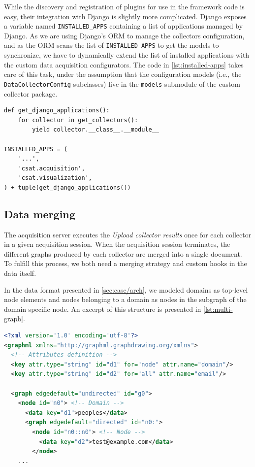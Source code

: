 While the discovery and registration of plugins for use in the framework code is easy, their integration with Django is slightly more complicated. Django exposes a variable named \texttt{INSTALLED\BreakableSlash{}\_APPS} containing a list of applications managed by Django. As we are using Django's ORM to manage the collectors configuration, and as the ORM scans the list of \texttt{INSTALLED\_APPS} to get the models to synchronize, we have to dynamically extend the list of installed applications with the custom data acquisition configurators. The code in \ref{lst:installed-apps} takes care of this task, under the assumption that the configuration models (i.e., the \texttt{DataCollectorConfig} subclasses) live in the \texttt{models} submodule of the custom collector package.

\begin{lstlisting}[caption={Dynamic construction of the list of installed apps.},label=lst:installed-apps]
def get_django_applications():
    for collector in get_collectors():
        yield collector.__class__.__module__

INSTALLED_APPS = (
    '...',
    'csat.acquisition',
    'csat.visualization',
) + tuple(get_django_applications())
\end{lstlisting}


\subsection{Data merging}

The acquisition server executes the \emph{Upload collector results} once for each collector in a given acquisition session. When the acquisition session terminates, the different graphs produced by each collector are merged into a single document. To fulfill this process, we both need a merging strategy and custom hooks in the data itself.

In the data format presented in \vref{sec:case/arch}, we modeled domains as top-level node elements and nodes belonging to a domain as nodes in the subgraph of the domain specific node. An excerpt of this structure is presented in \vref{lst:multi-graph}.

\begin{lstlisting}[caption={Multi-domain graphs in GraphML format.},label=lst:multi-graph,language=xml]
<?xml version='1.0' encoding='utf-8'?>
<graphml xmlns="http://graphml.graphdrawing.org/xmlns">
  <!-- Attributes definition -->
  <key attr.type="string" id="d1" for="node" attr.name="domain"/>
  <key attr.type="string" id="d2" for="all" attr.name="email"/>

  <graph edgedefault="undirected" id="g0">
    <node id="n0"> <!-- Domain -->
      <data key="d1">peoples</data>
      <graph edgedefault="directed" id="n0:">
        <node id="n0::n0"> <!-- Node -->
          <data key="d2">test@example.com</data>
        </node>
    ...
\end{lstlisting}

